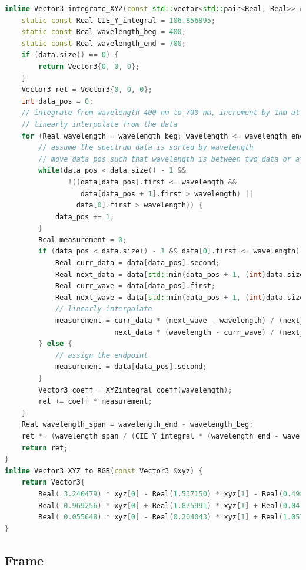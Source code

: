 \begin{lstlisting}[language=c++]
inline Vector3 integrate_XYZ(const std::vector<std::pair<Real, Real>> &data) {
    static const Real CIE_Y_integral = 106.856895;
    static const Real wavelength_beg = 400;
    static const Real wavelength_end = 700;
    if (data.size() == 0) {
        return Vector3{0, 0, 0};
    }
    Vector3 ret = Vector3{0, 0, 0};
    int data_pos = 0;
    // integrate from wavelength 400 nm to 700 nm, increment by 1nm at a time
    // linearly interpolate from the data
    for (Real wavelength = wavelength_beg; wavelength <= wavelength_end; wavelength += Real(1)) {
        // assume the spectrum data is sorted by wavelength
        // move data_pos such that wavelength is between two data or at one end
        while(data_pos < data.size() - 1 &&
               !((data[data_pos].first <= wavelength &&
                  data[data_pos + 1].first > wavelength) ||
                 data[0].first > wavelength)) {
            data_pos += 1;
        }
        Real measurement = 0;
        if (data_pos < data.size() - 1 && data[0].first <= wavelength) {
            Real curr_data = data[data_pos].second;
            Real next_data = data[std::min(data_pos + 1, (int)data.size() - 1)].second;
            Real curr_wave = data[data_pos].first;
            Real next_wave = data[std::min(data_pos + 1, (int)data.size() - 1)].first;
            // linearly interpolate
            measurement = curr_data * (next_wave - wavelength) / (next_wave - curr_wave) +
                          next_data * (wavelength - curr_wave) / (next_wave - curr_wave);
        } else {
            // assign the endpoint
            measurement = data[data_pos].second;
        }
        Vector3 coeff = XYZintegral_coeff(wavelength);
        ret += coeff * measurement;
    }
    Real wavelength_span = wavelength_end - wavelength_beg;
    ret *= (wavelength_span / (CIE_Y_integral * (wavelength_end - wavelength_beg)));
    return ret;
}
inline Vector3 XYZ_to_RGB(const Vector3 &xyz) {
    return Vector3{
        Real( 3.240479) * xyz[0] - Real(1.537150) * xyz[1] - Real(0.498535) * xyz[2],
        Real(-0.969256) * xyz[0] + Real(1.875991) * xyz[1] + Real(0.041556) * xyz[2],
        Real( 0.055648) * xyz[0] - Real(0.204043) * xyz[1] + Real(1.057311) * xyz[2]};
}
\end{lstlisting}

\subsection{Frame}

